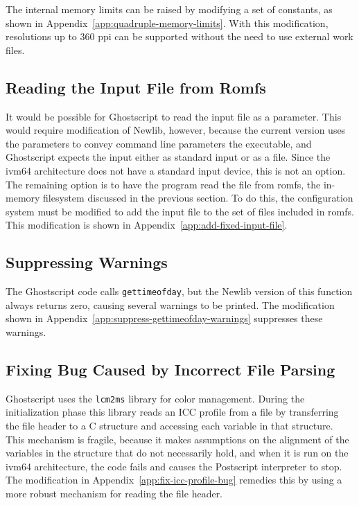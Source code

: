 \documentclass[a4paper,11pt]{article}
\newcommand{\code}[1]{\texttt{#1}}
\begin{document}
The internal memory limits can be raised by modifying a set of constants, as shown in Appendix~\ref{app:quadruple-memory-limits}.
With this modification, resolutions up to 360 ppi can be supported without the need to use external work files.

\subsection{Reading the Input File from Romfs}

It would be possible for Ghostscript to read the input file as a parameter.
This would require modification of Newlib, however, because the current version uses the parameters to convey command line parameters the executable, and Ghostscript expects the input either as standard input or as a file.
Since the ivm64 architecture does not have a standard input device, this is not an option.
The remaining option is to have the program read the file from romfs, the in-memory filesystem discussed in the previous section.
To do this, the configuration system must be modified to add the input file to the set of files included in romfs.
This modification is shown in Appendix~\ref{app:add-fixed-input-file}.

\subsection{Suppressing Warnings}

The Ghostscript code calls \code{gettimeofday}, but the Newlib version of this function always returns zero, causing several warnings to be printed.
The modification shown in Appendix~\ref{app:suppress-gettimeofday-warnings} suppresses these warnings.

\subsection{Fixing Bug Caused by Incorrect File Parsing}

Ghostscript uses the \code{lcm2ms} library for color management.
During the initialization phase this library reads an ICC profile from a file by transferring the file header to a C structure and accessing each variable in that structure.
This mechanism is fragile, because it makes assumptions on the alignment of the variables in the structure that do not necessarily hold, and when it is run on the ivm64 architecture, the code fails and causes the Postscript interpreter to stop.
The modification in Appendix~\ref{app:fix-icc-profile-bug} remedies this by using a more robust mechanism for reading the file header.
\end{document}

